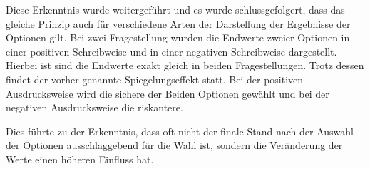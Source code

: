 Diese Erkenntnis wurde weitergeführt und es wurde schlussgefolgert, dass das gleiche Prinzip auch für verschiedene Arten der Darstellung der Ergebnisse der Optionen gilt. Bei zwei Fragestellung wurden die Endwerte zweier Optionen in einer positiven Schreibweise und in einer negativen Schreibweise dargestellt. Hierbei ist sind die Endwerte exakt gleich in beiden Fragestellungen. Trotz dessen findet der vorher genannte Spiegelungseffekt statt. Bei der positiven Ausdrucksweise wird die sichere der Beiden Optionen gewählt und bei der negativen Ausdrucksweise die riskantere. \parencite[S. 272]{Kahneman.2013} 

Dies führte zu der Erkenntnis, dass oft nicht der finale Stand nach der Auswahl der Optionen ausschlaggebend für die Wahl ist, sondern die Veränderung der Werte einen höheren Einfluss hat. \parencite[S. 156]{Markowitz.1952}

